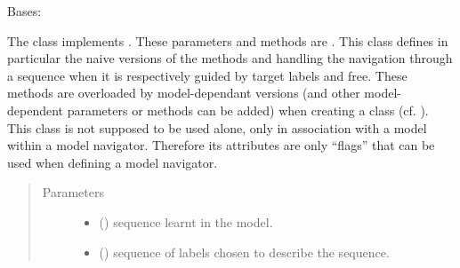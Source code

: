 \documentclass[letterpaper,10pt,english]{sphinxmanual}
\begin{document}
\begin{fulllineitems}
\label{\detokenize{index:Navigator.Navigator}}
Bases: 

The class {\hyperref[\detokenize{index:Navigator.Navigator}]{}} implements . 
These parameters and methods are . 
This class defines in particular the naive versions of the methods {\hyperref[\detokenize{index:Navigator.Navigator.simply_guided_navigation}]{}} and {\hyperref[\detokenize{index:Navigator.Navigator.free_navigation}]{}} handling the navigation through a sequence when it is respectively guided by target labels and free.  
These methods are overloaded by model-dependant versions (and other model-dependent parameters or methods can be added) when creating a  class (cf. ). 
This class is not supposed to be used alone, only in association with a model within a model navigator. Therefore its attributes are only “flags” that can be used when defining a model navigator.
\begin{quote}\begin{description}
\item[{Parameters}] \leavevmode\begin{itemize}
\item {} 
 () \textendash{} sequence learnt in the model.

\item {} 
 () \textendash{} sequence of labels chosen to describe the sequence.


\end{itemize}
\end{description}
\end{quote}
\end{fulllineitems}
\end{document}
